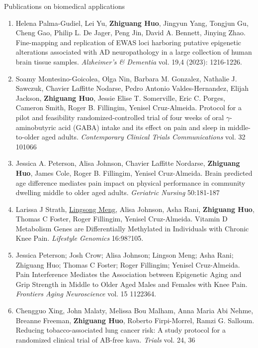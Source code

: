 \documentclass{resume} %
\begin{document}
\begin{rSection}{Publications on biomedical applications}
\begin{enumerate}[noitemsep,topsep=0pt, resume]
\item
Helena Palma-Gudiel, Lei Yu, {\bf Zhiguang Huo}, Jingyun Yang, Tongjun Gu, Cheng Gao, Philip L. De Jager, Peng Jin, David A. Bennett, Jinying Zhao.
Fine-mapping and replication of EWAS loci harboring putative epigenetic alterations associated with AD neuropathology in a large collection of human brain tissue samples. 
\emph{Alzheimer's \& Dementia} vol. 19,4 (2023): 1216-1226. 


\item Soamy Montesino-Goicolea, Olga Nin, Barbara M. Gonzalez, Nathalie J. Sawczuk, Chavier Laffitte Nodarse, Pedro Antonio Valdes-Hernandez, Elijah Jackson, {\bf Zhiguang Huo}, Jessie Elise T. Somerville, Eric C. Porges, Cameron Smith, Roger B. Fillingim, Yenisel Cruz-Almeida.
Protocol for a pilot and feasibility randomized-controlled trial of four weeks of oral $\gamma$-aminobutyric acid (GABA) intake and its effect on pain and sleep in middle-to-older aged adults.
\emph{Contemporary Clinical Trials Communications} vol. 32 101066

\item
 Jessica A. Peterson, Alisa Johnson, Chavier Laffitte Nordarse, {\bf Zhiguang Huo}, James Cole, Roger B. Fillingim, Yenisel Cruz-Almeida.
Brain predicted age difference mediates pain impact on physical performance in community dwelling middle to older aged adults.
\emph{Geriatric Nursing} 50:181-187


\item 
Larissa J Strath, \underline{Lingsong Meng}, Alisa Johnson, Asha Rani, {\bf Zhiguang Huo}, Thomas C Foster, Roger Fillingim, Yenisel Cruz-Almeida. 
Vitamin D Metabolism Genes are Differentially Methylated in Individuals with Chronic Knee Pain.
\emph{Lifestyle Genomics} 16:98?105. 

\item 
Jessica Peterson; Josh Crow; Alisa Johnson; Lingson Meng; Asha Rani; Zhiguang Huo; Thomas C Foster; Roger Fillingim; Yenisel Cruz-Almeida.
Pain Interference Mediates the Association between Epigenetic Aging and Grip Strength in Middle to Older Aged Males and Females with Knee Pain.
\emph{Frontiers Aging Neuroscience} vol. 15 1122364. 

\item 
Chengguo Xing, John Malaty, Melissa Bou Malham, Anna Maria Abi Nehme, Breanne Freeman, {\bf Zhiguang Huo}, Roberto Firpi-Morrel, Ramzi G. Salloum. 
Reducing tobacco-associated lung cancer risk: A study protocol for a randomized clinical trial of AB-free kava.
\emph{Trials} vol. 24, 36


\end{enumerate}
\end{rSection}
\end{document}
